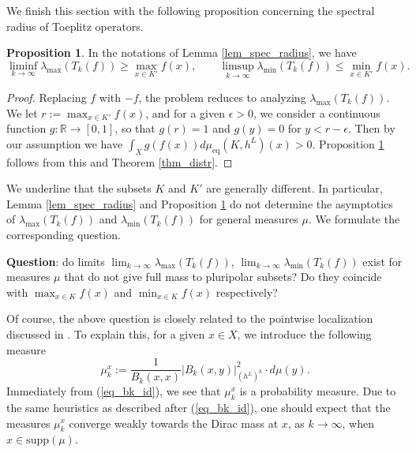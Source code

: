\documentclass[12pt]{article}
\numberwithin{equation}{section}
\theoremstyle{theorem}
\theoremstyle{definition}
\newtheorem{prop}[thm]{Proposition}
\theoremstyle{remark}
\newcommand{\real}{\mathbb{R}}
\begin{document}
	We finish this section with the following proposition concerning the spectral radius of Toeplitz operators.
	\begin{prop}\label{prop_spec_radius}
		In the notations of Lemma \ref{lem_spec_radius}, we have
		\begin{equation}
			\liminf_{k \to \infty} \lambda_{\max}(T_k(f)) \geq \max_{x \in K'} f(x),
			\qquad
			\limsup_{k \to \infty} \lambda_{\min}(T_k(f)) \leq \min_{x \in K'} f(x).
		\end{equation}
	\end{prop}
	\begin{sloppypar}
	\begin{proof}
		Replacing $f$ with $-f$, the problem reduces to analyzing $\lambda_{\max}(T_k(f))$.
		We let $r := \max_{x \in K'} f(x)$, and for a given $\epsilon > 0$, we consider a continuous function $g: \real \to [0, 1]$, so that $g(r) = 1$ and $g(y) = 0$ for $y < r - \epsilon$.
		Then by our assumption we have $\int_X g(f(x)) d \mu_{\mathrm{eq}}(K, h^L)(x) > 0$. 
		Proposition \ref{prop_spec_radius} follows from this and Theorem \ref{thm_distr}.
	\end{proof}
	\end{sloppypar}
	\par 
	We underline that the subsets $K$ and $K'$ are generally different.
	In particular, Lemma \ref{lem_spec_radius} and Proposition \ref{prop_spec_radius} do not determine the asymptotics of $\lambda_{\max}(T_k(f))$ and  $\lambda_{\min}(T_k(f))$ for general measures $\mu$.
	We formulate the corresponding question.
	\par 
	\textbf{Question}: do limits $\lim_{k \to \infty} \lambda_{\max}(T_k(f))$, $\lim_{k \to \infty} \lambda_{\min}(T_k(f))$ exist for measures $\mu$ that do not give full mass to pluripolar subsets? Do they coincide with $\max_{x \in K} f(x)$ and $\min_{x \in K} f(x)$ respectively?
	\par 
	Of course, the above question is closely related to the pointwise localization discussed in \cite{NevaiCond}.
	To explain this, for a given $x \in X$, we introduce the following measure
	\begin{equation}
		\mu_k^x := \frac{1}{B_k(x, x)} |B_k(x, y)|^{2}_{(h^L)^k} \cdot d\mu(y).
	\end{equation}
	Immediately from (\ref{eq_bk_id}), we see that $\mu_k^x$ is a probability measure. 
	Due to the same heuristics as described after (\ref{eq_bk_id}), one should expect that the measures $\mu_k^x$ converge weakly towards the Dirac mass at $x$, as $k \to \infty$, when $x \in {\textrm{supp}}(\mu)$.
\end{document}
